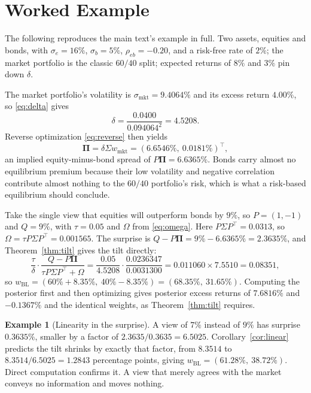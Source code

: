 \documentclass[11pt]{article}
\theoremstyle{remark}
\theoremstyle{definition}
\newtheorem*{example}{Example}
\begin{document}
\section{Worked Example}
\label{sec:example}

The following reproduces the main text's example in full. Two assets, equities and bonds, with $\sigma_e = 16\%$, $\sigma_b = 5\%$, $\rho_{eb} = -0.20$, and a risk-free rate of $2\%$; the market portfolio is the classic $60/40$ split; expected returns of $8\%$ and $3\%$ pin down $\delta$.

The market portfolio's volatility is $\sigma_{\mathrm{mkt}} = 9.4064\%$ and its excess return $4.00\%$, so \eqref{eq:delta} gives
\begin{equation*}
\delta = \frac{0.0400}{0.094064^2} = 4.5208.
\end{equation*}
Reverse optimization \eqref{eq:reverse} then yields
\begin{equation*}
\boldsymbol\Pi = \delta\Sigma w_{\mathrm{mkt}} = (6.6546\%,\ 0.0181\%)^\top,
\end{equation*}
an implied equity-minus-bond spread of $P\boldsymbol\Pi = 6.6365\%$. Bonds carry almost no equilibrium premium because their low volatility and negative correlation contribute almost nothing to the $60/40$ portfolio's risk, which is what a risk-based equilibrium should conclude.

Take the single view that equities will outperform bonds by $9\%$, so $P = (1,-1)$ and $Q = 9\%$, with $\tau = 0.05$ and $\Omega$ from \eqref{eq:omega}. Here $P\Sigma P^\top = 0.0313$, so $\Omega = \tau P\Sigma P^\top = 0.001565$. The surprise is $Q - P\boldsymbol\Pi = 9\% - 6.6365\% = 2.3635\%$, and Theorem~\ref{thm:tilt} gives the tilt directly:
\begin{equation*}
\frac{\tau}{\delta}\cdot\frac{Q - P\boldsymbol\Pi}{\tau P\Sigma P^\top + \Omega} = \frac{0.05}{4.5208}\cdot\frac{0.0236347}{0.0031300} = 0.011060 \times 7.5510 = 0.08351,
\end{equation*}
so $w_{\mathrm{BL}} = (60\% + 8.35\%,\ 40\% - 8.35\%) = (68.35\%,\ 31.65\%)$. Computing the posterior first and then optimizing gives posterior excess returns of $7.6816\%$ and $-0.1367\%$ and the identical weights, as Theorem~\ref{thm:tilt} requires.

\begin{example}[Linearity in the surprise]
\label{ex:linear}
A view of $7\%$ instead of $9\%$ has surprise $0.3635\%$, smaller by a factor of $2.3635/0.3635 = 6.5025$. Corollary~\ref{cor:linear} predicts the tilt shrinks by exactly that factor, from $8.3514$ to $8.3514/6.5025 = 1.2843$ percentage points, giving $w_{\mathrm{BL}} = (61.28\%,\ 38.72\%)$. Direct computation confirms it. A view that merely agrees with the market conveys no information and moves nothing.
\end{example}
\end{document}
